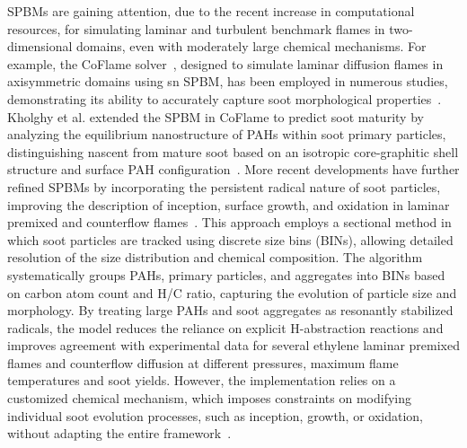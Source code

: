 SPBMs are gaining attention, due to the recent increase in computational resources, for simulating laminar and turbulent benchmark flames in two-dimensional domains, even with moderately large chemical mechanisms. For example, the CoFlame solver~\citep{eaves2016coflame}, designed to simulate laminar diffusion flames in axisymmetric domains using sn SPBM, has been employed in numerous studies, demonstrating its ability to accurately capture soot morphological properties~\citep{dworkin2011application, liu2015numerical}. Kholghy et al. extended the SPBM in CoFlame to predict soot maturity by analyzing the equilibrium nanostructure of PAHs within soot primary particles, distinguishing nascent from mature soot based on an isotropic core-graphitic shell structure and surface PAH configuration~\citep{kholghy2016core}. More recent developments have further refined SPBMs by incorporating the persistent radical nature of soot particles, improving the description of inception, surface growth, and oxidation in laminar premixed and counterflow flames~\citep{nobili2022modeling}. This approach employs a sectional method in which soot particles are tracked using discrete size bins (BINs), allowing detailed resolution of the size distribution and chemical composition. The algorithm systematically groups PAHs, primary particles, and aggregates into BINs based on carbon atom count and H/C ratio, capturing the evolution of particle size and morphology. By treating large PAHs and soot aggregates as resonantly stabilized radicals, the model reduces the reliance on explicit H-abstraction reactions and improves agreement with experimental data for several ethylene laminar premixed flames and counterflow diffusion at different pressures, maximum flame temperatures and soot yields. However, the implementation relies on a customized chemical mechanism, which imposes constraints on modifying individual soot evolution processes, such as inception, growth, or oxidation, without adapting the entire framework~\citep{cuoci2015opensmoke++, cuoci2013computational}.


